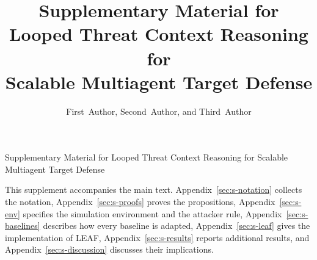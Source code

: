 \documentclass[journal,10pt]{IEEEtran}
\begin{document}
\title{Supplementary Material for\\ Looped Threat Context Reasoning for\\ Scalable Multiagent Target Defense}
\author{First~Author, Second~Author, and Third~Author}
%
{Supplementary Material for Looped Threat Context Reasoning for Scalable Multiagent Target Defense}
\maketitle

\noindent This supplement accompanies the main text. Appendix~\ref{sec:s-notation} collects the notation, Appendix~\ref{sec:s-proofs} proves the propositions, Appendix~\ref{sec:s-env} specifies the simulation environment and the attacker rule, Appendix~\ref{sec:s-baselines} describes how every baseline is adapted, Appendix~\ref{sec:s-leaf} gives the implementation of LEAF, Appendix~\ref{sec:s-results} reports additional results, and Appendix~\ref{sec:s-discussion} discusses their implications.





\end{document}
